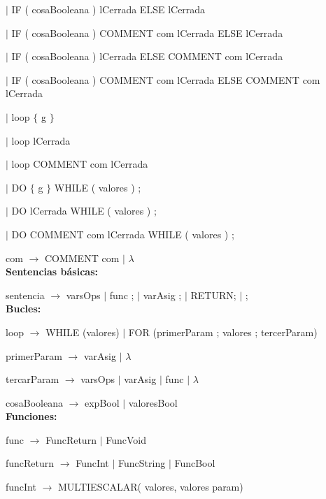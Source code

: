 \hspace{15mm}$|$ IF ( cosaBooleana ) lCerrada ELSE lCerrada 

\hspace{15mm}$|$ IF ( cosaBooleana ) COMMENT com lCerrada ELSE lCerrada 

\hspace{15mm}$|$ IF ( cosaBooleana ) lCerrada ELSE  COMMENT com lCerrada 

\hspace{15mm}$|$ IF ( cosaBooleana ) COMMENT com lCerrada ELSE  COMMENT com lCerrada

\hspace{15mm}$|$ loop $\{$ g $\}$ 

\hspace{15mm}$|$ loop lCerrada 

\hspace{15mm}$|$ loop COMMENT com lCerrada

\hspace{15mm}$|$ DO $\{$ g $\}$ WHILE ( valores ) ;
  
\hspace{15mm}$|$ DO lCerrada WHILE ( valores ) ;  
  
\hspace{15mm}$|$  DO COMMENT com lCerrada WHILE ( valores ) ;

com $\rightarrow$  COMMENT com $|$ $\lambda$ \\

\textbf{Sentencias básicas:}

sentencia $\rightarrow$ varsOps $|$ func ; $|$ varAsig ; $|$ RETURN; $|$ ; \\


\textbf{Bucles:}

loop $\rightarrow$ WHILE (valores) $|$ FOR (primerParam ; valores ; tercerParam)

primerParam $\rightarrow$  varAsig $|$ $\lambda$

tercarParam $\rightarrow$  varsOps $|$ varAsig $|$ func $|$ $\lambda$

cosaBooleana $\rightarrow$ expBool $|$ valoresBool \\
  

\textbf{Funciones:}

func $\rightarrow$ FuncReturn $|$ FuncVoid

funcReturn $\rightarrow$ FuncInt $|$ FuncString $|$ FuncBool

funcInt $\rightarrow$ MULTIESCALAR( valores, valores param)

